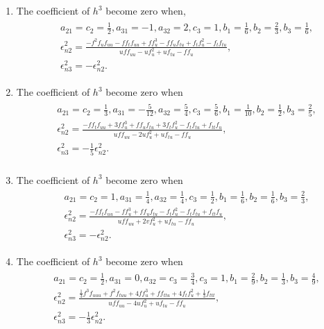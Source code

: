 \documentclass[a4paper, preprint,11pt]{elsarticle}
\numberwithin{equation}{section}
\begin{document}
 \begin{enumerate}[label=\Roman*.]
\item  The coefficient of $h^3$ become zero when,
\begin{eqnarray*}
\begin{aligned}
& a_{21} = c_2 = \frac{1}{2}, 
a_{31} = -1, 
a_{32} = 2,
c_3 = 1, 
b_1 = \frac{1}{6}, 
b_2 = \frac{2}{3}, 
b_3 = \frac{1}{6},\\
&  \epsilon^2_{n2} = \frac{-f^2 f_u f_{uu} - f f_t f_{uu} + f f_u^3 - f f_u f_{tu} + f_t f_u^2 - f_t f_{tu}
}{u f f_{uu} - u f_u^2 + u f_{tu} - f f_u},\\
& \epsilon^2_{n3} = -\epsilon^2_{n2}.
\end{aligned}    
\end{eqnarray*}

\item The coefficient of $h^3$ become zero when
\begin{eqnarray*}
\begin{aligned}
& a_{21} = c_2 = \frac{1}{3}, 
a_{31} = -\frac{5}{12}, 
a_{32} = \frac{5}{4}, 
c_3 = \frac{5}{6}, 
b_1 = \frac{1}{10}, 
b_2 = \frac{1}{2}, 
b_3 = \frac{2}{5},\\
& \epsilon^2_{n2} = \frac{  
    -f f_t f_{uu} + 3f f_u^3 + f f_u f_{tu} + 3f_t f_u^2 - f_t f_{tu} + f_{tt} f_u  
}{  
    u f f_{uu} - 2u f_u^2 + u f_{tu} - f f_u  
}  
, \\
& \epsilon^2_{n3} = -\frac{1}{5}\epsilon^2_{n2}.\\
\end{aligned}    
\end{eqnarray*}


\item  The coefficient of $h^3$ become zero when 
\begin{eqnarray*}
\begin{aligned}
& a_{21} = c_2 = 1, 
a_{31} = \frac{1}{4}, 
a_{32} = \frac{1}{4}, 
c_3 = \frac{1}{2}, 
b_1 = \frac{1}{6}, b_2 = \frac{1}{6}, 
b_3 = \frac{2}{3},\\
& \epsilon^2_{n2} =\frac{ -f f_t f_{uu} - f f_u^3 + f f_uf_{tu} - f_t f_u^2 - f_t f_{tu} + f_{tt} f_u  
}{  
    u f f_{uu} + 2v f_u^2 + u f_{tu} - f f_u }   , \\
& \epsilon^2_{n3} = -\epsilon^2_{n2}.
\end{aligned}    
\end{eqnarray*}
\item  The coefficient of $h^3$ become zero when
\begin{eqnarray*}
\begin{aligned}
& a_{21} = c_2 = \frac{1}{2}, 
a_{31} = 0, 
a_{32} = c_3 = \frac{3}{4},
c_3 = 1, 
b_1 = \frac{2}{9}, 
b_2 = \frac{1}{3}, 
b_3 = \frac{4}{9},  \\
& \epsilon^2_{n2} = 
\frac{
    \frac{1}{3}f^3 f_{uuu} + f^2 f_{tuu} + 4f f_u^3 + f f_{ttu} + 4f_t f_u^2 + \frac{1}{3}f_{ttt}
}{
    u f f_{uu} - 4u f_u^2 + u f_{tu} - f f_u
},\\
& \epsilon^2_{n3} = -\frac{1}{3}\epsilon^2_{n2}.
\end{aligned}    
\end{eqnarray*}
\end{enumerate}
\end{document}
